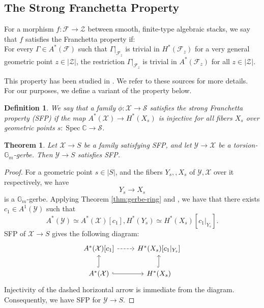 \documentclass[11pt]{amsart}
\newtheorem{theorem}{Theorem}[section]
\newtheorem{definition}{Definition}[subsection]
\theoremstyle{definition}
\newcommand{\ri}{\rightarrow}
\newcommand{\gm}{\mathbb{G}_m}
\newcommand{\spec}{\operatorname{Spec}}
\begin{document}
\subsection{The Strong Franchetta Property}
For a morphism $f: \mathcal{F}\ri \mathcal{Z}$ between smooth, finite-type algebraic stacks, we say that $f$ satisfies the Franchetta property if:\\
For every $\Gamma\in A^*(\mathcal{F})$ such that $\Gamma|_{\mathcal{F}_z}$ is trivial in $H^*(\mathcal{F}_z)$ for a very general geometric point $z\in |\mathcal{Z}|$, the restriction $\Gamma|_{\mathcal{F}_z}$ is trivial in $A^*(\mathcal{F}_z)$ for all $z\in |\mathcal{Z}|$.

This property has been studied in \cite{laterveer-franchetta, lifranchetta}. We refer to these sources for more details.
For our purposes, we define a variant of the property below.
\begin{definition}\label{SFP-defn}
  We say that a family $\phi: \mathcal{X}\ri \mathcal{S}$ satisfies the \textit{strong Franchetta property} (SFP) if the map $A^*(\mathcal{X})\ri H^*({X}_s)$ is  injective for all fibers $X_s$ over geometric points $s:\spec \mathbb{C}\ri \mathcal{S}$.
\end{definition}


\begin{theorem}\label{thm:gm-sfp}
   Let $\mathcal{X}\ri S$ be a family satisfying SFP, and let $\mathcal{Y}\ri\mathcal{X}$ be a torsion-$\mathbb{G}_m$-gerbe. Then $\mathcal{Y}\ri S$ satisfies SFP. 
\end{theorem}
\begin{proof}
    For a geometric point $s\in |S|$, and the fibers $Y_s,,X_s$ of $\mathcal{Y},\mathcal{X}$ over it respectively, we have  
    $$Y_s\ri X_s$$ is a $\gm$-gerbe. Applying Theorem \ref{thm:gerbe-ring} and \cite[Lemma 5.13]{MR3013029}, we have that there exists $c_1\in A^1(\mathcal{Y})$ such that $$A^*(\mathcal{Y})\simeq A^*(\mathcal{X})[c_1], H^*(Y_s)\simeq H^*(X_s)[c_1|_{Y_s}].$$
    SFP of $\mathcal{X}\ri S$ gives the following diagram:
$$\begin{tikzcd}
A^*(\mathcal{X})[c_1]\ar[r, dashed]& H^*(X_s)[c_1|_{Y_s}]\\
A^*(\mathcal{X})\ar[u, hook]\ar[r, hook]& H^*(X_s)\ar[u,hook]
\end{tikzcd}
$$
Injectivity of the dashed horizontal arrow is immediate from the diagram. Consequently, we have SFP for $\mathcal{Y}\ri S$. 
\end{proof}
\end{document}
